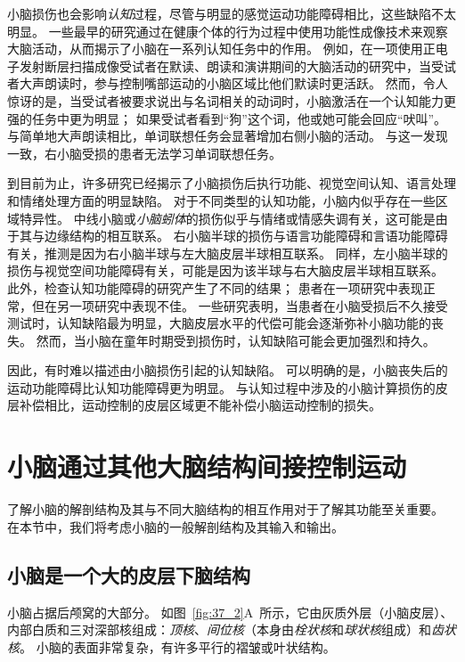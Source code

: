 小脑损伤也会影响\textit{认知}过程，尽管与明显的感觉运动功能障碍相比，这些缺陷不太明显。
一些最早的研究通过在健康个体的行为过程中使用功能性成像技术来观察大脑活动，从而揭示了小脑在一系列认知任务中的作用。
例如，在一项使用正电子发射断层扫描成像受试者在默读、朗读和演讲期间的大脑活动的研究中，当受试者大声朗读时，参与控制嘴部运动的小脑区域比他们默读时更活跃。
然而，令人惊讶的是，当受试者被要求说出与名词相关的动词时，小脑激活在一个认知能力更强的任务中更为明显；
如果受试者看到“狗”这个词，他或她可能会回应“吠叫”。
与简单地大声朗读相比，单词联想任务会显著增加右侧小脑的活动。
与这一发现一致，右小脑受损的患者无法学习单词联想任务。


到目前为止，许多研究已经揭示了小脑损伤后执行功能、视觉空间认知、语言处理和情绪处理方面的明显缺陷。
对于不同类型的认知功能，小脑内似乎存在一些区域特异性。
中线小脑或\textit{小脑蚓体}的损伤似乎与情绪或情感失调有关，这可能是由于其与边缘结构的相互联系。
右小脑半球的损伤与语言功能障碍和言语功能障碍有关，推测是因为右小脑半球与左大脑皮层半球相互联系。
同样，左小脑半球的损伤与视觉空间功能障碍有关，可能是因为该半球与右大脑皮层半球相互联系。
此外，检查认知功能障碍的研究产生了不同的结果；
患者在一项研究中表现正常，但在另一项研究中表现不佳。
一些研究表明，当患者在小脑受损后不久接受测试时，认知缺陷最为明显，大脑皮层水平的代偿可能会逐渐弥补小脑功能的丧失。
然而，当小脑在童年时期受到损伤时，认知缺陷可能会更加强烈和持久。


因此，有时难以描述由小脑损伤引起的认知缺陷。
可以明确的是，小脑丧失后的运动功能障碍比认知功能障碍更为明显。
与认知过程中涉及的小脑计算损伤的皮层补偿相比，运动控制的皮层区域更不能补偿小脑运动控制的损失。



\section{小脑通过其他大脑结构间接控制运动}

了解小脑的解剖结构及其与不同大脑结构的相互作用对于了解其功能至关重要。
在本节中，我们将考虑小脑的一般解剖结构及其输入和输出。


\subsection{小脑是一个大的皮层下脑结构}

小脑占据后颅窝的大部分。
如图~\ref{fig:37_2}A~所示，它由灰质外层（小脑皮层）、内部白质和三对深部核组成：\textit{顶核}、\textit{间位核}（本身由\textit{栓状核}和\textit{球状核}组成）和\textit{齿状核}。
小脑的表面非常复杂，有许多平行的褶皱或叶状结构。


